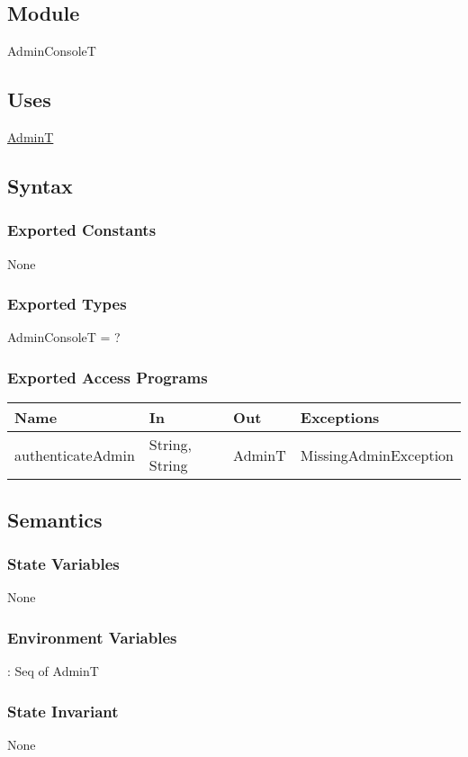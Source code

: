 \documentclass[12pt, titlepage]{article}
\begin{document}
\subsection{Module}
AdminConsoleT

\subsection{Uses}
\hyperref[admin:Module]{AdminT}

\subsection{Syntax}

\subsubsection{Exported Constants}
None

\subsubsection{Exported Types}
AdminConsoleT = ?

\subsubsection{Exported Access Programs}

\begin{tabular}{l l l l}
\hline
\textbf{Name} & \textbf{In} & \textbf{Out} & \textbf{Exceptions} \\
\hline
authenticateAdmin & String, String & AdminT & MissingAdminException \\
\hline
\end{tabular}

\subsection{Semantics}

\subsubsection{State Variables}
None

\subsubsection{Environment Variables}
: Seq of AdminT 

\subsubsection{State Invariant}
None
\end{document}
